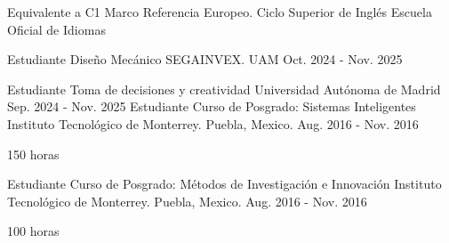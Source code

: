 


\begin{cventries}



\cventry
{Equivalente a C1 Marco Referencia Europeo.}
{Ciclo Superior de Inglés}
{Escuela Oficial de Idiomas}
{}
{}

  \cventry
    {Estudiante} %
    {Diseño Mecánico} %
    {SEGAINVEX. UAM} %
    {Oct. 2024 - Nov. 2025} %
    {
    }
    
  \cventry
    {Estudiante} %
    {Toma de decisiones y creatividad} %
    {Universidad Autónoma de Madrid} %
    {Sep. 2024 - Nov. 2025} %
    {
    }
  \cventry
    {Estudiante} %
    {Curso de Posgrado: Sistemas Inteligentes} %
    {Instituto Tecnológico de Monterrey. Puebla, Mexico.} %
    {Aug. 2016 - Nov. 2016} %
    {
      \begin{cvitems} %
        \item {150 horas}
      \end{cvitems}
    }

  \cventry
    {Estudiante} %
    {Curso de Posgrado: Métodos de Investigación e Innovación} %
    {Instituto Tecnológico de Monterrey. Puebla, Mexico.} %
    {Aug. 2016 - Nov. 2016} %
    {
      \begin{cvitems} %
        \item {100 horas}
      \end{cvitems}
    }


\end{cventries}
